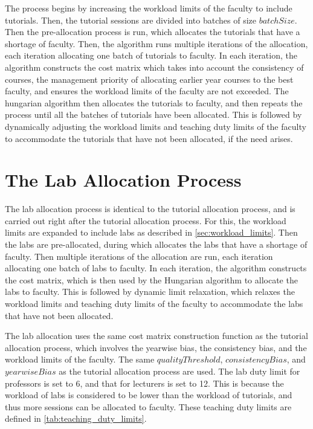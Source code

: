 The process begins by increasing the workload limits of the faculty to include tutorials. Then, the tutorial sessions are divided into batches of size $batchSize$. Then the pre-allocation process is run, which allocates the tutorials that have a shortage of faculty. Then, the algorithm runs multiple iterations of the allocation, each iteration allocating one batch of tutorials to faculty. In each iteration, the algorithm constructs the cost matrix which takes into account the consistency of courses, the management priority of allocating earlier year courses to the best faculty, and ensures the workload limits of the faculty are not exceeded. The hungarian algorithm then allocates the tutorials to faculty, and then repeats the process until all the batches of tutorials have been allocated. This is followed by dynamically adjusting the workload limits and teaching duty limits of the faculty to accommodate the tutorials that have not been allocated, if the need arises.

\section{The Lab Allocation Process}

The lab allocation process is identical to the tutorial allocation process, and is carried out right after the tutorial allocation process. For this, the workload limits are expanded to include labs as described in \autoref{sec:workload_limits}. Then the labs are pre-allocated, during which allocates the labs that have a shortage of faculty. Then multiple iterations of the allocation are run, each iteration allocating one batch of labs to faculty. In each iteration, the algorithm constructs the cost matrix, which is then used by the Hungarian algorithm to allocate the labs to faculty. This is followed by dynamic limit relaxation, which relaxes the workload limits and teaching duty limits of the faculty to accommodate the labs that have not been allocated.

The lab allocation uses the same cost matrix construction function as the tutorial allocation process, which involves the yearwise bias, the consistency bias, and the workload limits of the faculty. The same $qualityThreshold$, $consistencyBias$, and $yearwiseBias$ as the tutorial allocation process are used. The lab duty limit for professors is set to 6, and that for lecturers is set to 12. This is because the workload of labs is considered to be lower than the workload of tutorials, and thus more sessions can be allocated to faculty. These teaching duty limits are defined in \autoref{tab:teaching_duty_limits}.

